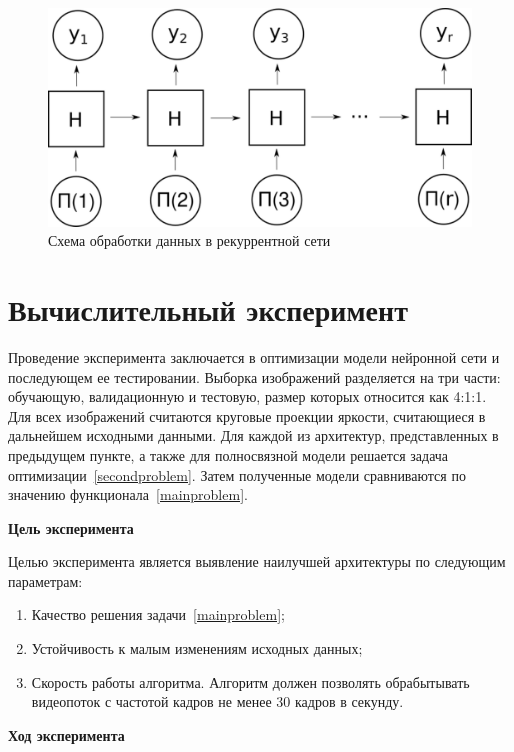 \documentclass[12pt, twoside]{article}
\begin{document}
\begin{figure}[!htbp]
\begin{center}
\includegraphics[scale=0.4]{fig/rnn.pdf}
\end{center}
\caption{Схема обработки данных в рекуррентной сети}
\label{fig:rnn}
\end{figure}

\section{Вычислительный эксперимент}

Проведение эксперимента заключается в оптимизации модели нейронной сети и последующем ее тестировании. Выборка изображений разделяется на три части: обучающую, валидационную и тестовую, размер которых относится как 4:1:1. Для всех изображений считаются круговые проекции яркости, считающиеся в дальнейшем исходными данными. Для каждой из архитектур, представленных в предыдущем пункте, а также для полносвязной модели решается задача оптимизации~\eqref{secondproblem}. Затем полученные модели сравниваются по значению функционала~\eqref{mainproblem}.

\textbf{Цель эксперимента}

Целью эксперимента является выявление наилучшей архитектуры по следующим параметрам:
\begin{enumerate}
	\item Качество решения задачи~\eqref{mainproblem};
	\item Устойчивость к малым изменениям исходных данных;
	\item Скорость работы алгоритма. Алгоритм должен позволять обрабытывать видеопоток с частотой кадров не менее 30 кадров в секунду.
\end{enumerate}

\textbf{Ход эксперимента}
\end{document}

